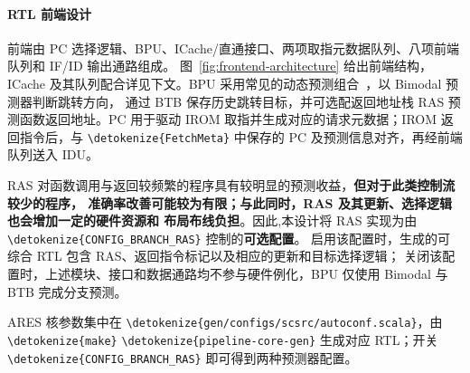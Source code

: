 \documentclass[UTF8,a4paper,12pt,fontset=none,scheme=plain]{ctexart}
\newcommand{\code}[1]{\texttt{\detokenize{#1}}}
\renewcommand{\code}[1]{{\small\ttfamily\urlstyle{tt}\expandafter\nolinkurl\expandafter{\detokenize{#1}}}}
\newcommand{\id}[1]{{\urlstyle{rm}\expandafter\nolinkurl\expandafter{\detokenize{#1}}}}
\begin{document}
\paragraph{RTL 前端设计}

前端由 PC 选择逻辑、BPU、ICache/直通接口、两项取指元数据队列、八项前端队列和 IF/ID 输出通路组成。
图~\ref{fig:frontend-architecture} 给出前端结构，ICache 及其队列配合详见下文。BPU 采用常见的动态预测组合~\cite{mittal2019survey}，以 Bimodal 预测器判断跳转方向，
通过 BTB 保存历史跳转目标，并可选配返回地址栈 RAS 预测函数返回地址。PC 用于驱动
IROM 取指并生成对应的请求元数据；IROM 返回指令后，与 \id{FetchMeta} 中保存的
PC 及预测信息对齐，再经前端队列送入 IDU。

RAS 对函数调用与返回较频繁的程序具有较明显的预测收益，\textbf{但对于此类控制流较少的程序，
准确率改善可能较为有限；与此同时，RAS 及其更新、选择逻辑也会增加一定的硬件资源和
布局布线负担}。因此,本设计将 RAS 实现为由 \code{CONFIG_BRANCH_RAS} 控制的\textbf{可选配置}。
启用该配置时，生成的可综合 RTL 包含 RAS、返回指令标记以及相应的更新和目标选择逻辑；
关闭该配置时，上述模块、接口和数据通路均不参与硬件例化，BPU 仅使用 Bimodal 与 BTB
完成分支预测。

ARES 核参数集中在 \code{gen/configs/scsrc/autoconf.scala}，由 \code{make} \code{pipeline-core-gen} 生成对应 RTL；开关 \code{CONFIG_BRANCH_RAS} 即可得到两种预测器配置。
\end{document}
